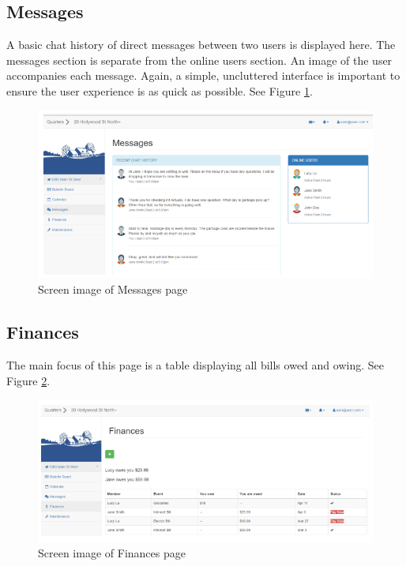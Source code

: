 \documentclass[12pt]{article}
\begin{document}
\subsection{Messages}
A basic chat history of direct messages between two users is displayed here. The messages section is separate from the online users section. An image of the user accompanies each message. Again, a simple, uncluttered interface is important to ensure the user experience is as quick as possible. See Figure \ref{fig:messages}.

\begin{figure}
\centering
\includegraphics[width=\textwidth]{messages}
\caption{Screen image of Messages page}
\label{fig:messages}
\end{figure}

\subsection{Finances}
The main focus of this page is a table displaying all bills owed and owing. See Figure \ref{fig:finances}.

\begin{figure}
\centering
\includegraphics[width=\textwidth]{finances}
\caption{Screen image of Finances page}
\label{fig:finances}
\end{figure}
\end{document}
